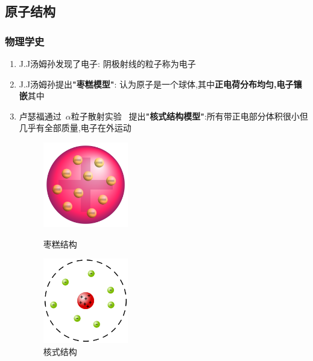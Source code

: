 \documentclass{article}
\begin{document}
\vspace{2em}

\subsection{原子结构}
\subsubsection{物理学史}
\begin{enumerate}
    \item J.J汤姆孙发现了电子: 阴极射线的粒子称为电子
    \item J.J汤姆孙提出\textbf{"枣糕模型"}: 认为原子是一个球体,其中\textbf{正电荷分布均匀,电子镶嵌}其中
    \item 卢瑟福通过\, $\alpha$粒子散射实验 \, 提出\textbf{"核式结构模型"}:所有带正电部分体积很小但几乎有全部质量,电子在外运动

          \begin{figure}[h]
              \centering
              \begin{minipage}{0.48\textwidth}
                  \centering
                  \includegraphics[width=10em]{./pictures/12.png}
                  \caption{枣糕结构}
              \end{minipage}
              \hfill
              \begin{minipage}{0.48\textwidth}
                  \centering
                  \includegraphics[width=10em]{./pictures/13.png}
                  \caption{核式结构}
              \end{minipage}
          \end{figure}
\end{enumerate}
\end{document}
